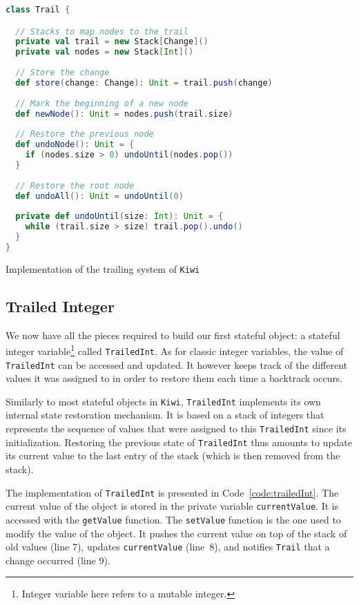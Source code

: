 \documentclass{llncs}
\begin{document}
\begin{code}
\begin{lstlisting}[language=scala, style=lineNumber]
class Trail {

  // Stacks to map nodes to the trail
  private val trail = new Stack[Change]()
  private val nodes = new Stack[Int]()
  
  // Store the change
  def store(change: Change): Unit = trail.push(change)
  
  // Mark the beginning of a new node
  def newNode(): Unit = nodes.push(trail.size)
  
  // Restore the previous node
  def undoNode(): Unit = {
    if (nodes.size > 0) undoUntil(nodes.pop())
  }
  
  // Restore the root node
  def undoAll(): Unit = undoUntil(0)
  
  private def undoUntil(size: Int): Unit = {
    while (trail.size > size) trail.pop().undo()
  }
}
\end{lstlisting}
\caption{Implementation of the trailing system of \texttt{Kiwi}}
\label{code:trailImplem}
\end{code}

\subsection{Trailed Integer}
\label{sec:trailedint}

We now have all the pieces required to build our first stateful object: a stateful integer variable\footnote{Integer variable here refers to a mutable integer.} called \texttt{TrailedInt}. 
As for classic integer variables, the value of \texttt{TrailedInt} can be accessed and updated. 
It however keeps track of the different values it was assigned to in order to restore them each time a backtrack occurs.

Similarly to most stateful objects in \texttt{Kiwi}, \texttt{TrailedInt} implements its own internal state restoration mechanism. 
It is based on a stack of integers that represents the sequence of values that were assigned to this \texttt{TrailedInt} since its initialization.
Restoring the previous state of \texttt{TrailedInt} thus amounts to update its current value to the last entry of the stack (which is then removed from the stack). 

The implementation of \texttt{TrailedInt} is presented in Code~\ref{code:trailedInt}.
The current value of the object is stored in the private variable \texttt{currentValue}. 
It is accessed with the \texttt{getValue} function. 
The \texttt{setValue} function is the one used to modify the value of the object. 
It pushes the current value on top of the stack of old values (line 7), updates \texttt{currentValue} (line~8), and notifies \texttt{Trail} that a change occurred (line 9). 
\end{document}
